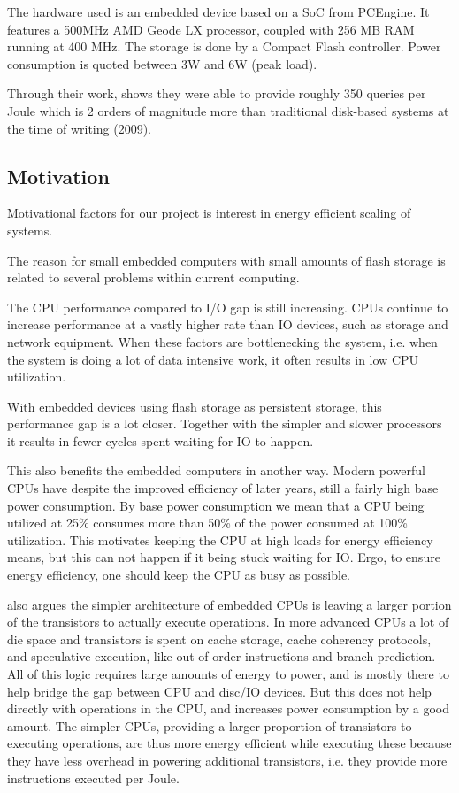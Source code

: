 The hardware used is an embedded device based on a SoC from PCEngine. It features a 500MHz AMD Geode LX processor, coupled with 256 MB RAM running at 400 MHz. The storage is done by a Compact Flash controller. Power consumption is quoted between 3W and 6W (peak load).

Through their work, \cite{fawn} shows they were able to provide roughly 350 queries per Joule which is 2 orders of magnitude more than traditional disk-based systems at the time of writing (2009). 

\subsection{Motivation}
Motivational factors for our project is interest in energy efficient scaling of systems.

The reason for small embedded computers with small amounts of flash storage is related to several problems within current computing.

The CPU performance compared to I/O gap is still increasing. CPUs continue to increase performance at a vastly higher rate than IO devices, such as storage and network equipment.
When these factors are bottlenecking the system, i.e. when the system is doing a lot of data intensive work, it often results in low CPU utilization.

With embedded devices using flash storage as persistent storage, this performance gap is a lot closer.
Together with the simpler and slower processors it results in fewer cycles spent waiting for IO to happen.

This also benefits the embedded computers in another way. Modern powerful CPUs have despite the improved efficiency of later years, still a fairly high base power consumption.
By base power consumption we mean that a CPU being utilized at 25\% consumes more than 50\% of the power consumed at 100\% utilization. 
This motivates keeping the CPU at high loads for energy efficiency means, but this can not happen if it being stuck waiting for IO.
Ergo, to ensure energy efficiency, one should keep the CPU as busy as possible.

\cite{fawn} also argues the simpler architecture of embedded CPUs is leaving a larger portion of the transistors to actually execute operations.
In more advanced CPUs a lot of die space and transistors is spent on cache storage, cache coherency protocols, and speculative execution, like out-of-order instructions and branch prediction.
All of this logic requires large amounts of energy to power, and is mostly there to help bridge the gap between CPU and disc/IO devices. But this does not help directly with operations in the CPU, and increases power consumption by a good amount.
The simpler CPUs, providing a larger proportion of transistors to executing operations, are thus more energy efficient while executing these because they have less overhead in powering additional transistors, i.e. they provide more instructions executed per Joule.


